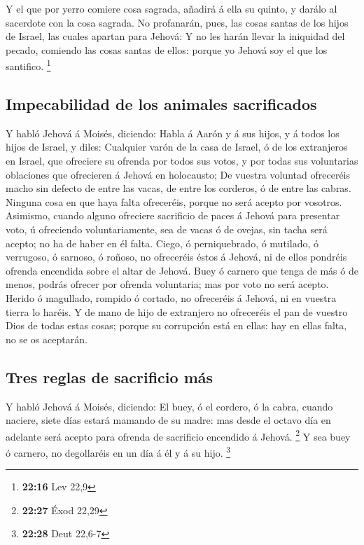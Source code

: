  Y el que por yerro comiere cosa sagrada, añadirá á ella
su quinto, y darálo al sacerdote con la cosa sagrada.  No
profanarán, pues, las cosas santas de los hijos de Israel, las cuales
apartan para Jehová:  Y no les harán llevar la iniquidad
del pecado, comiendo las cosas santas de ellos: porque yo Jehová soy el
que los santifico. \footnote{\textbf{22:16} Lev 22,9}

\hypertarget{impecabilidad-de-los-animales-sacrificados}{%
\subsection{Impecabilidad de los animales
sacrificados}\label{impecabilidad-de-los-animales-sacrificados}}

 Y habló Jehová á Moisés, diciendo:  Habla
á Aarón y á sus hijos, y á todos los hijos de Israel, y diles: Cualquier
varón de la casa de Israel, ó de los extranjeros en Israel, que
ofreciere su ofrenda por todos sus votos, y por todas sus voluntarias
oblaciones que ofrecieren á Jehová en holocausto;  De
vuestra voluntad ofreceréis macho sin defecto de entre las vacas, de
entre los corderos, ó de entre las cabras.  Ninguna cosa
en que haya falta ofreceréis, porque no será acepto por vosotros.
 Asimismo, cuando alguno ofreciere sacrificio de paces á
Jehová para presentar voto, ú ofreciendo voluntariamente, sea de vacas ó
de ovejas, sin tacha será acepto; no ha de haber en él falta.
 Ciego, ó perniquebrado, ó mutilado, ó verrugoso, ó
sarnoso, ó roñoso, no ofreceréis éstos á Jehová, ni de ellos pondréis
ofrenda encendida sobre el altar de Jehová.  Buey ó
carnero que tenga de más ó de menos, podrás ofrecer por ofrenda
voluntaria; mas por voto no será acepto.  Herido ó
magullado, rompido ó cortado, no ofreceréis á Jehová, ni en vuestra
tierra lo haréis.  Y de mano de hijo de extranjero no
ofreceréis el pan de vuestro Dios de todas estas cosas; porque su
corrupción está en ellas: hay en ellas falta, no se os aceptarán.

\hypertarget{tres-reglas-de-sacrificio-muxe1s}{%
\subsection{Tres reglas de sacrificio
más}\label{tres-reglas-de-sacrificio-muxe1s}}

 Y habló Jehová á Moisés, diciendo:  El
buey, ó el cordero, ó la cabra, cuando naciere, siete días estará
mamando de su madre: mas desde el octavo día en adelante será acepto
para ofrenda de sacrificio encendido á Jehová. \footnote{\textbf{22:27}
  Éxod 22,29}  Y sea buey ó carnero, no degollaréis en un
día á él y á su hijo. \footnote{\textbf{22:28} Deut 22,6-7}

